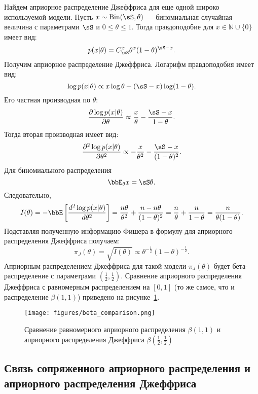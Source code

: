 \begin{example}
Найдем априорное распределение Джеффриса для еще одной широко используемой модели.
Пусть $x \sim \mathrm{Bin}(\sS, \theta)$ --- биномиальная случайная величина с параметрами $\sS$ и $0 \leq \theta \leq 1$.
Тогда правдоподобие для $x \in \mathbb{N} \cup \{0\}$имеет вид:
\[
p(x | \theta) = C_{\sS}^x \theta^x (1- \theta)^{\sS - x}.
\]
Получим априорное распределение Джеффриса.
Логарифм правдоподобия имеет вид:
\[
\log p(x | \theta) \propto x \log \theta + (\sS - x) \log(1 - \theta).
\]
Его частная производная по $\theta$:
\[
\frac{\partial \log p(x | \theta)}{\partial \theta} \propto \frac{x}{\theta} - \frac{\sS - x}{1 - \theta}.
\]
Тогда вторая производная имеет вид:
\[
\frac{ \partial^2 \log p(x | \theta)}{\partial \theta^2} \propto -\frac{x}{\theta^2} - \frac{\sS - x}{(1 - \theta)^2}.
\]
Для биномиального распределения
\[
\bbE_\theta x = \sS \theta.
\]
Следовательно,
\[
I(\theta) = -\bbE \left[\frac{d^2 \log p(x | \theta)}{d \theta^2} \right] = \frac{n \theta}{\theta^2} + \frac{n - n\theta}{(1 - \theta)^2} =
\frac{n}{\theta} + \frac{n}{1 - \theta} = \frac{n}{\theta (1 - \theta)}.
\]
Подставляя полученную информацию Фишера в формулу для априорного распределения Джеффриса получаем:
\[
\pi_J(\theta) = \sqrt{I(\theta)} \propto \theta^{-\frac12} (1 - \theta)^{-\frac12}.
\]
Априорным распределением Джеффриса для такой модели $\pi_J(\theta)$ будет бета-распределение с параметрами $(\frac12, \frac12)$.
Сравнение априорного распределения Джеффриса с равномерным распределением на $[0, 1]$ (то же самое, что и распределение $\beta(1, 1)$)
приведено на рисунке~\ref{fig:beta_comparison}.

\begin{figure}
\centering
\texttt{[image: figures/beta\_comparison.png]}
\caption{Сравнение равномерного априорного распределения $\beta(1, 1)$ и априорного распределения Джеффриса $\beta(\frac12, \frac12)$}
\label{fig:beta_comparison}
\end{figure}
\end{example}

\subsection{Связь сопряженного априорного распределения и априорного распределения Джеффриса}

